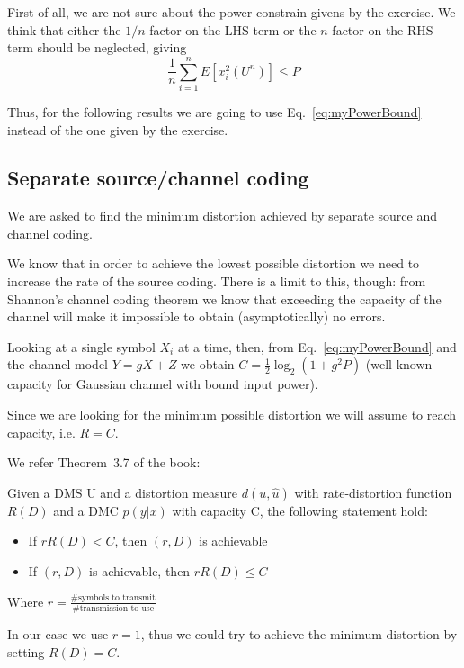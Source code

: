 
First of all, we are not sure about the power constrain givens by the exercise. We think that either the $1/n$ factor on the LHS term or the $n$ factor on the RHS term should be neglected, giving
%
\begin{equation}\label{eq:myPowerBound}
\frac{1}{n} \sum_{i=1}^n E[x_i^2(U^n)] \leq P
\end{equation}

Thus, for the following results we are going to use Eq.~\eqref{eq:myPowerBound} instead of the one given by the exercise.

\subsection{Separate source/channel coding}
We are asked to find the minimum distortion achieved by separate source and channel coding.

We know that in order to achieve the lowest possible distortion we need to increase the rate of the source coding. There is a limit to this, though: from Shannon's channel coding theorem we know that exceeding the capacity of the channel will make it impossible to obtain (asymptotically) no errors.

Looking at a single symbol $X_i$ at a time, then, from Eq.~\eqref{eq:myPowerBound} and the channel model $Y=gX+Z$ we obtain $C= \frac{1}{2} \log_2(1+g^2P)$ (well known capacity for Gaussian channel with bound input power).

Since we are looking for the minimum possible distortion we will assume to reach capacity, i.e. $R=C$.

We refer Theorem~3.7 of the book:
%
\begin{theorem}
Given a DMS U and a distortion measure $d(u,\hat{u})$ with rate-distortion function $R(D)$ and a DMC $p(y|x)$ with capacity C, the following statement hold:
\begin{itemize}
	\item If $rR(D)<C$, then $(r,D)$ is achievable
	\item If $(r,D)$ is achievable, then $rR(D) \leq C$
\end{itemize}
Where $r=\frac{\mbox{\#symbols to transmit}}{\mbox{\#transmission to use}}$
\end{theorem}
In our case we use $r=1$, thus we could try to achieve the minimum distortion by setting $R(D)=C$.

